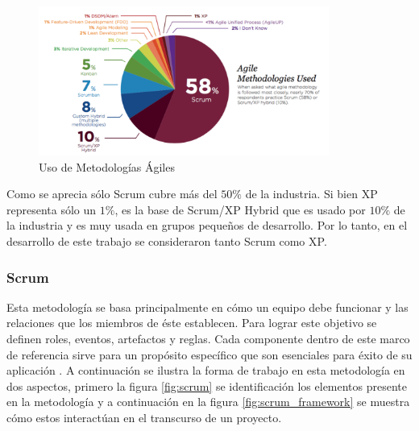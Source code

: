 \begin{figure}[ht]
	\begin{center}
  \includegraphics[width=0.85\textwidth]{./figures/chapter_02/05_agile_methodologies_used.png}
  \caption{Uso de Metodologías Ágiles}
  \label{fig:agile_methodologies_used}
	\end{center}
\end{figure}

Como se aprecia sólo Scrum cubre más del $50\%$ de la industria. Si bien XP representa sólo un $1\%$, es la base de Scrum/XP Hybrid que es usado por $10\%$ de la industria y es muy usada en grupos pequeños de desarrollo. Por lo tanto, en el desarrollo de este trabajo se consideraron tanto Scrum como XP.

\subsubsection{Scrum \label{sec:scrum}}

Esta metodología se basa principalmente en cómo un equipo debe funcionar y las relaciones que los miembros de éste establecen. Para lograr este objetivo se definen roles, eventos, artefactos y reglas. Cada componente dentro de este marco de referencia sirve para un propósito específico que son esenciales para éxito de su aplicación \cite{scrum_guide}. A continuación se ilustra la forma de trabajo en esta metodología en dos aspectos, primero la figura \ref{fig:scrum} se identificación los elementos presente en la metodología y a continuación en la figura \ref{fig:scrum_framework} se muestra cómo estos interactúan en el transcurso de un proyecto.


